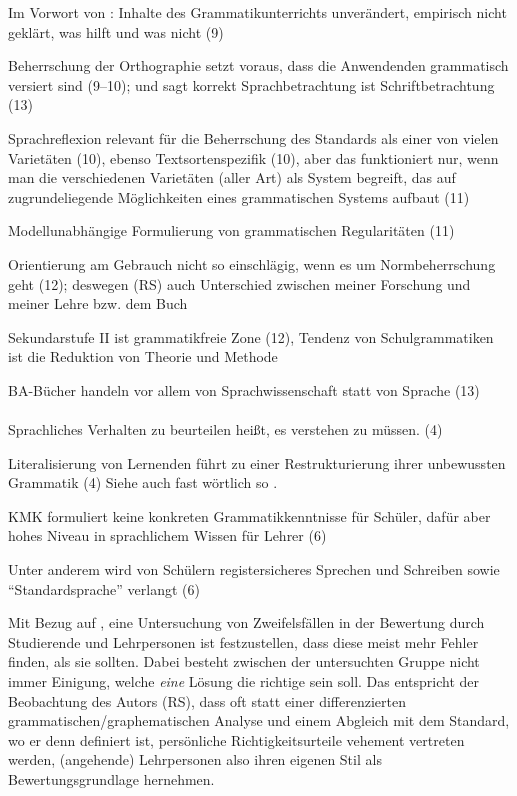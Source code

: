 Im Vorwort von \citet[2]{KoepckeZiegler2013}: Inhalte des Grammatikunterrichts unverändert, empirisch nicht geklärt, was hilft und was nicht (9)

Beherrschung der Orthographie setzt voraus, dass die Anwendenden grammatisch versiert sind (9--10); und \citet{Duerscheid2013} sagt korrekt Sprachbetrachtung ist Schriftbetrachtung (13)

Sprachreflexion relevant für die Beherrschung des Standards als einer von vielen Varietäten (10), ebenso Textsortenspezifik (10), aber das funktioniert nur, wenn man die verschiedenen Varietäten (aller Art) als System begreift, das auf zugrundeliegende Möglichkeiten eines grammatischen Systems aufbaut (11)

Modellunabhängige Formulierung von grammatischen Regularitäten (11)

Orientierung am Gebrauch nicht so einschlägig, wenn es um Normbeherrschung geht (12); deswegen (RS) auch Unterschied zwischen meiner Forschung und meiner Lehre bzw. dem Buch

Sekundarstufe II ist grammatikfreie Zone (12), Tendenz von Schulgrammatiken ist die Reduktion von Theorie und Methode

BA-Bücher handeln vor allem von Sprachwissenschaft statt von Sprache (13)

\paragraph*{\citet{Eisenberg2004}}

Sprachliches Verhalten zu beurteilen heißt, es verstehen zu müssen. (4)

Literalisierung von Lernenden führt zu einer Restrukturierung ihrer unbewussten Grammatik (4) Siehe auch fast wörtlich so \citet[78]{Portmanntselikas2011}.

KMK formuliert keine konkreten Grammatikkenntnisse für Schüler, dafür aber hohes Niveau in sprachlichem Wissen für Lehrer (6)

Unter anderem wird von Schülern registersicheres Sprechen und Schreiben sowie "`Standardsprache"' verlangt (6)

Mit Bezug auf \citet{Braun1979}, eine Untersuchung von Zweifelsfällen in der Bewertung durch Studierende und Lehrpersonen ist festzustellen, dass diese meist mehr Fehler finden, als sie sollten.
Dabei besteht zwischen der untersuchten Gruppe nicht immer Einigung, welche \textit{eine} Lösung die richtige sein soll.
Das entspricht der Beobachtung des Autors (RS), dass oft statt einer differenzierten grammatischen\slash graphematischen Analyse und einem Abgleich mit dem Standard, wo er denn definiert ist, persönliche Richtigkeitsurteile vehement vertreten werden, (angehende) Lehrpersonen also ihren eigenen Stil als Bewertungsgrundlage hernehmen.

